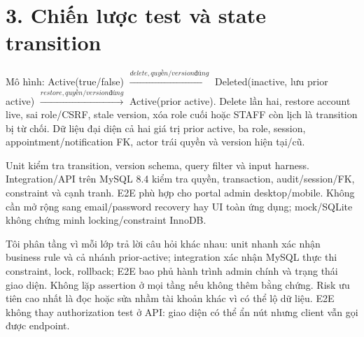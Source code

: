 \documentclass[10pt,a4paper]{article}
\begin{document}
\section*{3. Chiến lược test và state transition}
Mô hình: Active(true/false) $\xrightarrow{delete, quyền/version đúng}$ Deleted(inactive, lưu prior active) $\xrightarrow{restore, quyền/version đúng}$ Active(prior active). Delete lần hai, restore account live, sai role/CSRF, stale version, xóa role cuối hoặc STAFF còn lịch là transition bị từ chối. Dữ liệu đại diện cả hai giá trị prior active, ba role, session, appointment/notification FK, actor trái quyền và version hiện tại/cũ.

Unit kiểm tra transition, version schema, query filter và input harness. Integration/API trên MySQL 8.4 kiểm tra quyền, transaction, audit/session/FK, constraint và cạnh tranh. E2E phù hợp cho portal admin desktop/mobile. Không cần mở rộng sang email/password recovery hay UI toàn ứng dụng; mock/SQLite không chứng minh locking/constraint InnoDB.

Tôi phân tầng vì mỗi lớp trả lời câu hỏi khác nhau: unit nhanh xác nhận business rule và cả nhánh prior-active; integration xác nhận MySQL thực thi constraint, lock, rollback; E2E bao phủ hành trình admin chính và trạng thái giao diện. Không lặp assertion ở mọi tầng nếu không thêm bằng chứng. Risk ưu tiên cao nhất là đọc hoặc sửa nhầm tài khoản khác vì có thể lộ dữ liệu. E2E không thay authorization test ở API: giao diện có thể ẩn nút nhưng client vẫn gọi được endpoint.
\end{document}
